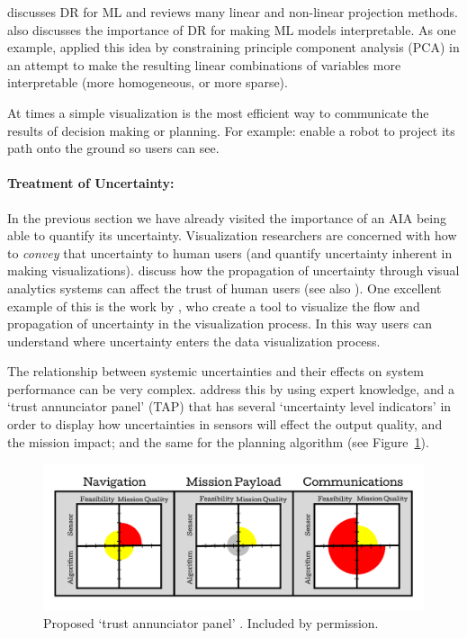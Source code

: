 \citet{Venna2007-yj} discusses DR for ML and reviews many linear and non-linear projection methods. \citet{Vellido2012-nm} also discusses the importance of DR for making ML models interpretable. As one example, \citet{Chipman2005-om} applied this idea by constraining principle component analysis (PCA) in an attempt to make the resulting linear combinations of variables more interpretable (more homogeneous, or more sparse).

At times a simple visualization is the most efficient way to communicate the results of decision making or planning. For example: \citet{Chadalavada2015-wx} enable a robot to project its path onto the ground so users can see.

\paragraph{Treatment of Uncertainty:}
In the previous section we have already visited the importance of an AIA being able to quantify its uncertainty. Visualization researchers are concerned with how to \emph{convey} that uncertainty to human users (and quantify uncertainty inherent in making visualizations). \citet{Sacha2016-tu} discuss how the propagation of uncertainty through visual analytics systems can affect the trust of human users (see also \cite{Correa2009-hi}).
One excellent example of this is the work by \citet{Wu2012-qi}, who create a tool to visualize the flow and propagation of uncertainty in the visualization process. In this way users can understand where uncertainty enters the data visualization process.

The relationship between systemic uncertainties and their effects on system performance can be very complex. \citet{Hutchins2015-if} address this by using expert knowledge, and a `trust annunciator panel' (TAP) that has several `uncertainty level indicators' in order to display how uncertainties in sensors will effect the output quality, and the mission impact; and the same for the planning algorithm (see Figure~\ref{fig:hutchins_fig}).

\begin{figure}[htpb]
    \centering
    \includegraphics[width=0.7\linewidth]{Figures/Hutchins_fig.pdf}
    \caption{Proposed `trust annunciator panel' \cite{Hutchins2015-if}. Included by permission.}
    \label{fig:hutchins_fig}
\end{figure}

